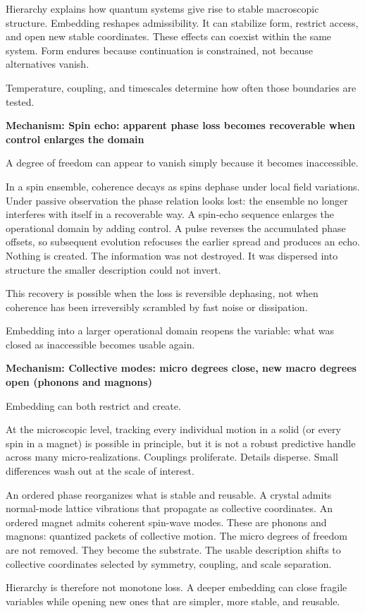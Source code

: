 \documentclass[11pt,twoside,openright]{book}
\newenvironment{mechanismbox}[1]
  {\begin{framed}\noindent\textbf{Mechanism: #1}\par\medskip}
  {\end{framed}}
\begin{document}
Hierarchy explains how quantum systems give rise to stable macroscopic structure. Embedding reshapes admissibility. It can stabilize form, restrict access, and open new stable coordinates. These effects can coexist within the same system. Form endures because continuation is constrained, not because alternatives vanish.

Temperature, coupling, and timescales determine how often those boundaries are tested.

\begin{mechanismbox}{Spin echo: apparent phase loss becomes recoverable when control enlarges the domain}
A degree of freedom can appear to vanish simply because it becomes inaccessible.

In a spin ensemble, coherence decays as spins dephase under local field variations. Under passive observation the phase relation looks lost: the ensemble no longer interferes with itself in a recoverable way. A spin-echo sequence enlarges the operational domain by adding control. A pulse reverses the accumulated phase offsets, so subsequent evolution refocuses the earlier spread and produces an echo. Nothing is created. The information was not destroyed. It was dispersed into structure the smaller description could not invert.

This recovery is possible when the loss is reversible dephasing, not when coherence has been irreversibly scrambled by fast noise or dissipation.

Embedding into a larger operational domain reopens the variable:
what was closed as inaccessible becomes usable again.
\end{mechanismbox}
\begin{mechanismbox}{Collective modes: micro degrees close, new macro degrees open (phonons and magnons)}
Embedding can both restrict and create.

At the microscopic level, tracking every individual motion in a solid (or every spin in a magnet) is possible in principle, but it is not a robust predictive handle across many micro-realizations. Couplings proliferate. Details disperse. Small differences wash out at the scale of interest.

An ordered phase reorganizes what is stable and reusable. A crystal admits normal-mode lattice vibrations that propagate as collective coordinates. An ordered magnet admits coherent spin-wave modes. These are phonons and magnons: quantized packets of collective motion. The micro degrees of freedom are not removed. They become the substrate. The usable description shifts to collective coordinates selected by symmetry, coupling, and scale separation.

Hierarchy is therefore not monotone loss.
A deeper embedding can close fragile variables
while opening new ones that are simpler, more stable, and reusable.
\end{mechanismbox}
\end{document}
